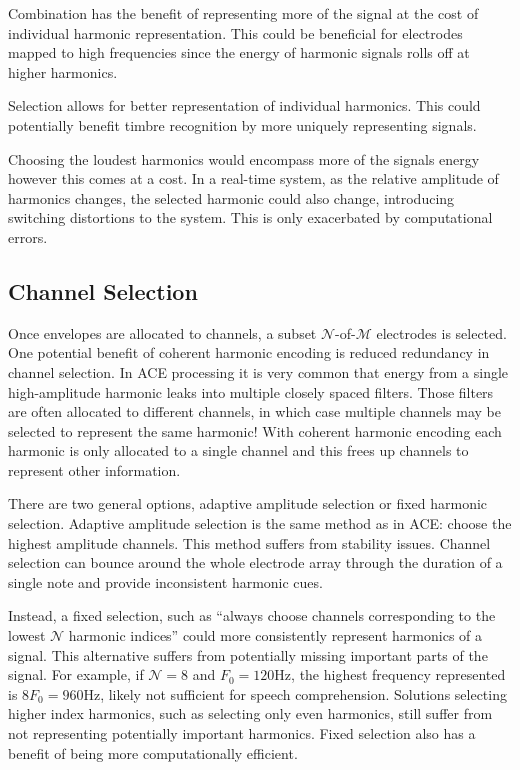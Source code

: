 \documentclass [11pt, proquest,oneside] {ganter_thesis}[2015/03/03]
\begin{document}
Combination has the benefit of representing more of the signal at the cost of individual harmonic representation. This could be beneficial for electrodes mapped to high frequencies since the energy of harmonic signals rolls off at higher harmonics.

Selection allows for better representation of individual harmonics.  This could potentially benefit timbre recognition by more uniquely representing signals.

Choosing the loudest harmonics would encompass more of the signals energy however this comes at a cost.  In a real-time system, as the relative amplitude of harmonics changes, the selected harmonic could also change, introducing switching distortions to the system.  This is only exacerbated by computational errors.


\subsection{Channel Selection}

Once envelopes are allocated to channels, a subset $\mathcal{N}$-of-$\mathcal{M}$ electrodes is selected.  One potential benefit of coherent harmonic encoding is reduced redundancy in channel selection.  In ACE processing it is very common that energy from a single high-amplitude harmonic leaks into multiple closely spaced filters.  Those filters are often allocated to different channels, in which case multiple channels may be selected to represent the same harmonic!  With coherent harmonic encoding each harmonic is only allocated to a single channel and this frees up channels to represent other information.

There are two general options, adaptive amplitude selection or fixed harmonic selection.  Adaptive amplitude selection is the same method as in ACE: choose the highest amplitude channels.  This method suffers from stability issues.  Channel selection can bounce around the whole electrode array through the duration of a single note and provide inconsistent harmonic cues.

Instead, a fixed selection, such as ``always choose channels corresponding to the lowest $\mathcal{N}$ harmonic indices'' could more consistently represent harmonics of a signal.  This alternative suffers from potentially missing important parts of the signal.  For example, if $\mathcal{N} = 8$ and $F_0 = 120$Hz, the highest frequency represented is $8F_0 = 960$Hz, likely not sufficient for speech comprehension.  Solutions selecting higher index harmonics, such as selecting only even harmonics, still suffer from not representing potentially important harmonics.  Fixed selection also has a benefit of being more computationally efficient.
\end{document}
